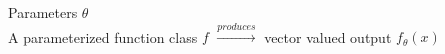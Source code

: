 \documentclass[preview]{standalone}
\begin{document}
Parameters $\theta$\\A parameterized function class $f$ $\xrightarrow{produces}$ vector valued output $f_\theta(x)$\\
\end{document}
